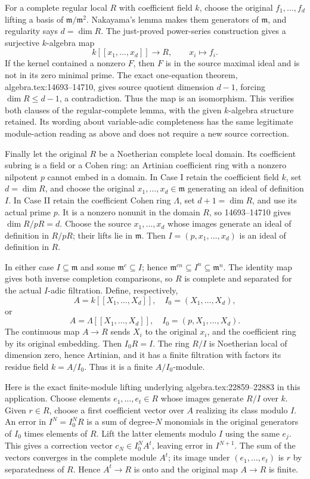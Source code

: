For a complete regular local \(R\) with coefficient field \(k\), choose the original \(f_1,\ldots,f_d\) lifting a basis of \(\mathfrak m/\mathfrak m^2\). Nakayama's lemma makes them generators of \(\mathfrak m\), and regularity says \(d=\dim R\). The just-proved power-series construction gives a surjective \(k\)-algebra map \[
 k[[x_1,\ldots,x_d]]\longrightarrow R,\qquad x_i\longmapsto f_i.
\] If the kernel contained a nonzero \(F\), then \(F\) is in the source maximal ideal and is not in its zero minimal prime. The exact one-equation theorem, algebra.tex:14693--14710, gives source quotient dimension \(d-1\), forcing \(\dim R\leq d-1\), a contradiction. Thus the map is an isomorphism. This verifies both clauses of the regular-complete lemma, with the given \(k\)-algebra structure retained. Its wording about variable-adic completeness has the same legitimate module-action reading as above and does not require a new source correction.

Finally let the original \(R\) be a Noetherian complete local domain. Its coefficient subring is a field or a Cohen ring: an Artinian coefficient ring with a nonzero nilpotent \(p\) cannot embed in a domain. In Case I retain the coefficient field \(k\), set \(d=\dim R\), and choose the original \(x_1,\ldots,x_d\in\mathfrak m\) generating an ideal of definition \(I\). In Case II retain the coefficient Cohen ring \(\Lambda\), set \(d+1=\dim R\), and use its actual prime \(p\). It is a nonzero nonunit in the domain \(R\), so 14693--14710 gives \(\dim R/pR=d\). Choose the source \(x_1,\ldots,x_d\) whose images generate an ideal of definition in \(R/pR\); their lifts lie in \(\mathfrak m\). Then \(I=(p,x_1,\ldots,x_d)\) is an ideal of definition in \(R\).

In either case \(I\subseteq\mathfrak m\) and some \(\mathfrak m^c\subseteq I\); hence \(\mathfrak m^{cn}\subseteq I^n\subseteq\mathfrak m^n\). The identity map gives both inverse completion comparisons, so \(R\) is complete and separated for the actual \(I\)-adic filtration. Define, respectively, \[
 A=k[[X_1,\ldots,X_d]],\quad I_0=(X_1,\ldots,X_d),
\] or \[
 A=\Lambda[[X_1,\ldots,X_d]],\quad I_0=(p,X_1,\ldots,X_d).
\] The continuous map \(A\to R\) sends \(X_i\) to the original \(x_i\), and the coefficient ring by its original embedding. Then \(I_0R=I\). The ring \(R/I\) is Noetherian local of dimension zero, hence Artinian, and it has a finite filtration with factors its residue field \(k=A/I_0\). Thus it is a finite \(A/I_0\)-module.

Here is the exact finite-module lifting underlying algebra.tex:22859--22883 in this application. Choose elements \(e_1,\ldots,e_t\in R\) whose images generate \(R/I\) over \(k\). Given \(r\in R\), choose a first coefficient vector over \(A\) realizing its class modulo \(I\). An error in \(I^N=I_0^NR\) is a sum of degree-\(N\) monomials in the original generators of \(I_0\) times elements of \(R\). Lift the latter elements modulo \(I\) using the same \(e_j\). This gives a correction vector \(c_N\in I_0^N A^t\), leaving error in \(I^{N+1}\). The sum of the vectors converges in the complete module \(A^t\); its image under \((e_1,\ldots,e_t)\) is \(r\) by separatedness of \(R\). Hence \(A^t\to R\) is onto and the original map \(A\to R\) is finite.

